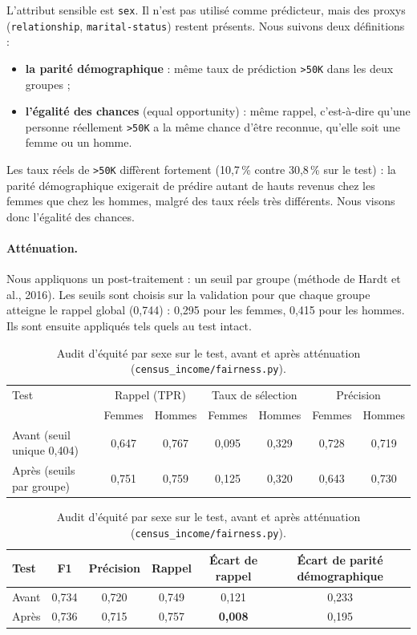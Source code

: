 \documentclass[11pt,a4paper]{article}
\begin{document}
L'attribut sensible est \texttt{sex}. Il n'est pas utilisé comme prédicteur, mais des proxys (\texttt{relationship}, \texttt{marital-status}) restent présents. Nous suivons deux définitions :
\begin{itemize}
\item \textbf{la parité démographique} : même taux de prédiction \texttt{>50K} dans les deux groupes ;
\item \textbf{l'égalité des chances} (equal opportunity) : même rappel, c'est-à-dire qu'une personne réellement \texttt{>50K} a la même chance d'être reconnue, qu'elle soit une femme ou un homme.
\end{itemize}
Les taux réels de \texttt{>50K} diffèrent fortement (10,7\,\% contre 30,8\,\% sur le test) : la parité démographique exigerait de prédire autant de hauts revenus chez les femmes que chez les hommes, malgré des taux réels très différents. Nous visons donc l'égalité des chances.

\paragraph{Atténuation.} Nous appliquons un post-traitement : un seuil par groupe (méthode de Hardt et al., 2016). Les seuils sont choisis sur la validation pour que chaque groupe atteigne le rappel global (0,744) : 0,295 pour les femmes, 0,415 pour les hommes. Ils sont ensuite appliqués tels quels au test intact.

\begin{table}[H]
\centering\small
\begin{tabular}{lcccccc}
\toprule
Test & \multicolumn{2}{c}{Rappel (TPR)} & \multicolumn{2}{c}{Taux de sélection} & \multicolumn{2}{c}{Précision} \\
 & Femmes & Hommes & Femmes & Hommes & Femmes & Hommes \\
\midrule
Avant (seuil unique 0,404) & 0,647 & 0,767 & 0,095 & 0,329 & 0,728 & 0,719 \\
Après (seuils par groupe) & 0,751 & 0,759 & 0,125 & 0,320 & 0,643 & 0,730 \\
\bottomrule
\end{tabular}

\vspace{6pt}
\begin{tabular}{lccccc}
\toprule
Test & F1 & Précision & Rappel & Écart de rappel & Écart de parité démographique \\
\midrule
Avant & 0,734 & 0,720 & 0,749 & 0,121 & 0,233 \\
Après & 0,736 & 0,715 & 0,757 & \textbf{0,008} & 0,195 \\
\bottomrule
\end{tabular}
\caption{Audit d'équité par sexe sur le test, avant et après atténuation (\texttt{census\_income/fairness.py}).}
\end{table}
\end{document}
